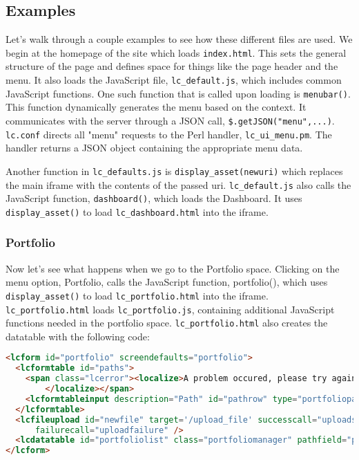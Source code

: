 \subsection{Examples}
Let's walk through a couple examples to see how these different files are used.  We begin at the homepage of the site which loads {\tt index.html}.  This sets the general structure of the page and defines space for things like the page header and the menu.  It also loads the JavaScript file, {\tt lc\_default.js}, which includes common JavaScript functions.  One such function that is called upon loading is {\tt menubar()}.  This function dynamically generates the menu based on the context.  It communicates with the server through a JSON call, {\tt \$.getJSON("menu",...)}.  {\tt  lc.conf} directs all "menu" requests to the Perl handler, {\tt lc\_ui\_menu.pm}.  The handler returns a JSON object containing the appropriate menu data.

Another function in {\tt lc\_defaults.js} is {\tt display\_asset(newuri)} which replaces the main iframe with the contents of the passed uri.  {\tt lc\_default.js} also calls the JavaScript function, {\tt dashboard()}, which loads the Dashboard.  It uses {\tt display\_asset()} to load {\tt lc\_dashboard.html} into the iframe.

\subsubsection{Portfolio}
Now let's see what happens when we go to the Portfolio space.  Clicking on the menu option, Portfolio, calls the JavaScript function, portfolio(), which uses {\tt display\_asset()} to load {\tt lc\_portfolio.html} into the iframe.  {\tt lc\_portfolio.html} loads {\tt lc\_portfolio.js}, containing additional JavaScript functions needed in the portfolio space.  {\tt lc\_portfolio.html} also creates the datatable with the following code: 

\begin{lstlisting}[language=HTML,frame=single,title=lc\_portfolio.html]
<lcform id="portfolio" screendefaults="portfolio">
  <lcformtable id="paths">
    <span class="lcerror"><localize>A problem occured, please try again later.
        </localize></span>
    <lcformtableinput description="Path" id="pathrow" type="portfoliopath" />
  </lcformtable>
  <lcfileupload id="newfile" target='/upload_file' successcall="uploadsuccess" 
      failurecall="uploadfailure" />
  <lcdatatable id="portfoliolist" class="portfoliomanager" pathfield="path" />
</lcform> 
\end{lstlisting}

